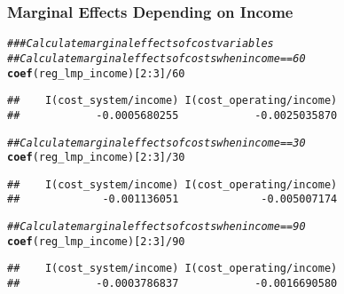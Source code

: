 \documentclass{beamer}\usepackage[]{graphicx}\usepackage[]{color}
\makeatletter
\newcommand{\hlnum}[1]{\textcolor[rgb]{0.686,0.059,0.569}{#1}}%
\newcommand{\hlcom}[1]{\textcolor[rgb]{0.678,0.584,0.686}{\textit{#1}}}%
\newcommand{\hlopt}[1]{\textcolor[rgb]{0,0,0}{#1}}%
\newcommand{\hlstd}[1]{\textcolor[rgb]{0.345,0.345,0.345}{#1}}%
\newcommand{\hlkwd}[1]{\textcolor[rgb]{0.737,0.353,0.396}{\textbf{#1}}}%
\newenvironment{kframe}{%
 \def\at@end@of@kframe{}%
 \ifinner\ifhmode%
  \def\at@end@of@kframe{\end{minipage}}%
  \begin{minipage}{\columnwidth}%
 \fi\fi%
 \def\FrameCommand##1{\hskip\@totalleftmargin \hskip-\fboxsep
 \colorbox{shadecolor}{##1}\hskip-\fboxsep
     \hskip-\linewidth \hskip-\@totalleftmargin \hskip\columnwidth}%
 \MakeFramed {\advance\hsize-\width
   \@totalleftmargin\z@ \linewidth\hsize
   \@setminipage}}%
 {\par\unskip\endMakeFramed%
 \at@end@of@kframe}
\newenvironment{knitrout}{}{} %
\makeatother
\begin{document}
\begin{frame}[fragile]\frametitle{Marginal Effects Depending on Income}
\begin{knitrout}\footnotesize
{}\color{fgcolor}\begin{kframe}
\begin{alltt}
\hlcom{### Calculate marginal effects of cost variables}
\hlcom{## Calculate marginal effects of costs when income == 60}
\hlkwd{coef}\hlstd{(reg_lmp_income)[}\hlnum{2}\hlopt{:}\hlnum{3}\hlstd{]} \hlopt{/} \hlnum{60}
\end{alltt}
\begin{verbatim}
##    I(cost_system/income) I(cost_operating/income) 
##            -0.0005680255            -0.0025035870
\end{verbatim}
\begin{alltt}
\hlcom{## Calculate marginal effects of costs when income == 30}
\hlkwd{coef}\hlstd{(reg_lmp_income)[}\hlnum{2}\hlopt{:}\hlnum{3}\hlstd{]} \hlopt{/} \hlnum{30}
\end{alltt}
\begin{verbatim}
##    I(cost_system/income) I(cost_operating/income) 
##             -0.001136051             -0.005007174
\end{verbatim}
\begin{alltt}
\hlcom{## Calculate marginal effects of costs when income == 90}
\hlkwd{coef}\hlstd{(reg_lmp_income)[}\hlnum{2}\hlopt{:}\hlnum{3}\hlstd{]} \hlopt{/} \hlnum{90}
\end{alltt}
\begin{verbatim}
##    I(cost_system/income) I(cost_operating/income) 
##            -0.0003786837            -0.0016690580
\end{verbatim}
\end{kframe}
\end{knitrout}
\end{frame}
\end{document}
